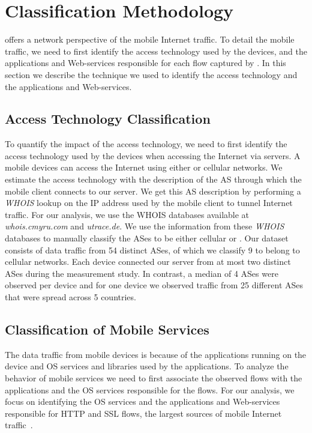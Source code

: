 \section{Classification Methodology}
\label{sec:classification-methodology}

\platname offers a network perspective of the mobile Internet traffic.
To detail the mobile traffic, we need to first identify the access technology used by the devices, and the applications and Web-services responsible for each flow captured by \platname.
In this section we describe the technique we used to identify the access technology and the applications and Web-services. 

\subsection{Access Technology Classification}

To quantify the impact of the access technology, we need to first identify the access technology used by the devices when accessing the Internet via \platname servers.
A mobile devices can access the Internet using either \wifi or cellular networks. 
We estimate the access technology with the description of the AS through which the mobile client connects to our \platname server. 
We get this AS description by performing a \emph{WHOIS} lookup on the IP address used by the mobile client to tunnel Internet traffic. 
For our analysis, we use the WHOIS databases available at \emph{whois.cmyru.com} and \emph{utrace.de}.
We use the information from these \emph{WHOIS} databases to manually classify the ASes to be either cellular or \wifi.
Our dataset consists of data traffic from 54 distinct ASes, of which we classify 9 to belong to cellular networks.
Each device connected our \platname server from at most two distinct ASes during the measurement study.
In contrast, a median of 4 \wifi ASes were observed per device and for one device we observed traffic from 25 different \wifi ASes that were spread across 5 countries. 

\subsection{Classification of Mobile Services}

The data traffic from mobile devices is because of the applications running on the device and OS services and libraries used by the applications. 
To analyze the behavior of mobile services we need to first associate the observed flows with the applications and the OS services responsible for the flows.
For our analysis, we focus on identifying the OS services and the applications and Web-services responsible for HTTP and SSL flows, the largest sources of mobile Internet traffic~\cite{maier:mobtraffic,falaki:mobileusage,xu:appusage}.

